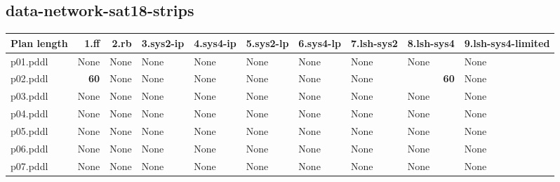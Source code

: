 \documentclass{article}
\begin{document}
\hypertarget{plan_length-data-network-sat18-strips}{}
\subsection*{data-network-sat18-strips}

\begin{tabular}{@{}lrrrrrrrrr@{}}
Plan length & 1.ff & 2.rb & 3.sys2-ip & 4.sys4-ip & 5.sys2-lp & 6.sys4-lp & 7.lsh-sys2 & 8.lsh-sys4 & 9.lsh-sys4-limited \\
\midrule
p01.pddl & \multicolumn{1}{|l|}{None} & \multicolumn{1}{|l|}{None} & \multicolumn{1}{|l|}{None} & \multicolumn{1}{|l|}{None} & \multicolumn{1}{|l|}{None} & \multicolumn{1}{|l|}{None} & \multicolumn{1}{|l|}{None} & \multicolumn{1}{|l|}{None} & \multicolumn{1}{|l|}{None} \\
p02.pddl & \textbf{60} & \multicolumn{1}{|l|}{None} & \multicolumn{1}{|l|}{None} & \multicolumn{1}{|l|}{None} & \multicolumn{1}{|l|}{None} & \multicolumn{1}{|l|}{None} & \multicolumn{1}{|l|}{None} & \textbf{60} & \multicolumn{1}{|l|}{None} \\
p03.pddl & \multicolumn{1}{|l|}{None} & \multicolumn{1}{|l|}{None} & \multicolumn{1}{|l|}{None} & \multicolumn{1}{|l|}{None} & \multicolumn{1}{|l|}{None} & \multicolumn{1}{|l|}{None} & \multicolumn{1}{|l|}{None} & \multicolumn{1}{|l|}{None} & \multicolumn{1}{|l|}{None} \\
p04.pddl & \multicolumn{1}{|l|}{None} & \multicolumn{1}{|l|}{None} & \multicolumn{1}{|l|}{None} & \multicolumn{1}{|l|}{None} & \multicolumn{1}{|l|}{None} & \multicolumn{1}{|l|}{None} & \multicolumn{1}{|l|}{None} & \multicolumn{1}{|l|}{None} & \multicolumn{1}{|l|}{None} \\
p05.pddl & \multicolumn{1}{|l|}{None} & \multicolumn{1}{|l|}{None} & \multicolumn{1}{|l|}{None} & \multicolumn{1}{|l|}{None} & \multicolumn{1}{|l|}{None} & \multicolumn{1}{|l|}{None} & \multicolumn{1}{|l|}{None} & \multicolumn{1}{|l|}{None} & \multicolumn{1}{|l|}{None} \\
p06.pddl & \multicolumn{1}{|l|}{None} & \multicolumn{1}{|l|}{None} & \multicolumn{1}{|l|}{None} & \multicolumn{1}{|l|}{None} & \multicolumn{1}{|l|}{None} & \multicolumn{1}{|l|}{None} & \multicolumn{1}{|l|}{None} & \multicolumn{1}{|l|}{None} & \multicolumn{1}{|l|}{None} \\
p07.pddl & \multicolumn{1}{|l|}{None} & \multicolumn{1}{|l|}{None} & \multicolumn{1}{|l|}{None} & \multicolumn{1}{|l|}{None} & \multicolumn{1}{|l|}{None} & \multicolumn{1}{|l|}{None} & \multicolumn{1}{|l|}{None} & \multicolumn{1}{|l|}{None} & \multicolumn{1}{|l|}{None} \\

\end{tabular}
\end{document}
